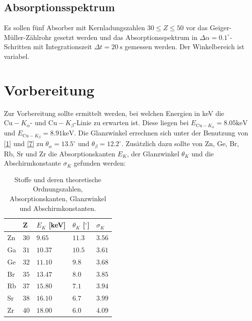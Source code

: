 \subsection{Absorptionsspektrum}
Es sollen fünf Absorber mit Kernladungszahlen $30\leq Z\leq 50$ vor das Geiger-Müller-Zählrohr gesetzt werden und das Absorptionsspektrum in $\Delta\alpha=0.1^{\circ}$-Schritten mit Integrationszeit $\Delta t=20\ \si{\s}$ gemessen werden. Der Winkelbereich ist variabel.

\section{Vorbereitung}
Zur Vorbereitung sollte ermittelt werden, bei welchen Energien in keV die $\textrm{Cu}-K_{\alpha}$- und $\textrm{Cu}-K_{\beta}$-Linie zu erwarten ist. Diese liegen bei $E_{\textrm{Cu}-K_{\alpha}}=8.05 \si{\keV}$ und $E_{\textrm{Cu}-K_{\beta}}=8.91 \si{\keV}$. Die Glanzwinkel errechnen sich unter der Benutzung von \eqref{1} und \eqref{7} zu $\theta_{\alpha}=13.5^\circ$ und $\theta_{\beta}=12.2^\circ$.
Zusätzlich dazu sollte von Zn, Ge, Br, Rb, Sr und Zr die Absorptionskanten $E_{K}$, der Glanzwinkel $\theta_{K}$ und die Abschirmkonstante $\sigma_{K}$ gefunden werden:
\begin{table}[H]
  \centering
  \begin{tabular}{l|l|l|l|l}
  & Z & $E_{K}$ [keV] & $\theta_{K}$ [$^{\circ}$] & $\sigma_{K}$ \\\hline
  Zn & $30$ & $9.65$ & $11.3$ & $3.56$\\\hline
  Ga & $31$ & $10.37$ & $10.5$ & $3.61$\\\hline
  Ge & $32$ & $11.10$ & $9.8$ & $3.68$\\\hline
  Br & $35$ & $13.47$ & $8.0$ & $3.85$\\\hline
  Rb & $37$ & $15.80$ & $7.1$ & $3.94$\\\hline
  Sr & $38$ & $16.10$ & $6.7$ & $3.99$\\\hline
  Zr & $40$ & $18.00$ & $6.0$ & $4.09$\\\hline
  \end{tabular}
  \caption{Stoffe und deren theoretische Ordnungszahlen, Absorptionskanten, Glanzwinkel und Abschirmkonstanten.}
  \label{tab:1}
\end{table}
